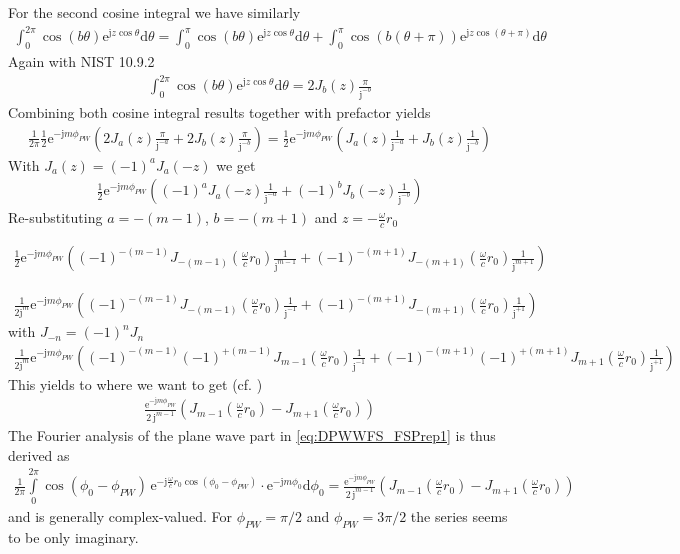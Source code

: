 \documentclass[a4paper,BCOR=15mm,10pt,twoside]{scrartcl}
\newcommand\e{\mathrm{e}}  %
\newcommand\im{\mathrm{j}}  %
\newcommand\fsd{\mathrm{d}}  %
\newcommand{\ExCalcCol}[2][CalcColor]{\textcolor{#1}{#2}} %
\begin{document}
For the second cosine integral we have similarly
\begin{align}
\int_0^{2\pi} \cos(b\theta) \mathrm{e}^{\mathrm{j} z \cos\theta} \fsd \theta = 
\int_0^{\pi} \cos(b\theta) \mathrm{e}^{\mathrm{j} z \cos\theta} \fsd \theta +
\int_0^{\pi} \cos(b(\theta+\pi)) \mathrm{e}^{\mathrm{j} z \cos(\theta+\pi)} \fsd \theta
\end{align}
Again with NIST 10.9.2
\begin{align}
\int_0^{2\pi} \cos(b\theta) \mathrm{e}^{\mathrm{j} z \cos\theta} \fsd \theta = 
2 J_{b}(z) \frac{\pi}{\im^{-b}}
\end{align}
Combining both cosine integral results together with prefactor yields
\begin{align}
\frac{1}{2\pi}
\frac{1}{2}
\e^{- \im m \phi_{PW}}
(2 J_{a}(z) \frac{\pi}{\im^{-a}} + 2 J_{b}(z) \frac{\pi}{\im^{-b}})
=
\frac{1}{2}
\e^{- \im m \phi_{PW}}
(J_{a}(z) \frac{1}{\im^{-a}} + J_{b}(z) \frac{1}{\im^{-b}})
\end{align}
With $J_a(z) = (-1)^a J_a(-z)$ we get
\begin{align}
\frac{1}{2}
\e^{- \im m \phi_{PW}}
((-1)^a J_{a}(-z) \frac{1}{\im^{-a}} + (-1)^b J_{b}(-z) \frac{1}{\im^{-b}})
\end{align}
Re-substituting $a=-(m-1)$, $b=-(m+1)$ and $z=-\frac{\omega}{c} r_0 $
\begin{calc}
\ExCalcCol{
\begin{align}
\frac{1}{2}
\e^{- \im m \phi_{PW}}
((-1)^{-(m-1)} J_{-(m-1)}(\frac{\omega}{c} r_0) \frac{1}{\im^{m-1}} + (-1)^{-(m+1)} J_{-(m+1)}(\frac{\omega}{c} r_0) \frac{1}{\im^{m+1}})
\end{align}
}
\end{calc}
\begin{align}
\frac{1}{2 \im^m}
\e^{- \im m \phi_{PW}}
((-1)^{-(m-1)} J_{-(m-1)}(\frac{\omega}{c} r_0) \frac{1}{\im^{-1}} + (-1)^{-(m+1)} J_{-(m+1)}(\frac{\omega}{c} r_0) \frac{1}{\im^{+1}})
\end{align}
with $J_{-n} = (-1)^n J_n$
\begin{align}
\frac{1}{2 \im^m}
\e^{- \im m \phi_{PW}}
((-1)^{-(m-1)} (-1)^{+(m-1)} J_{m-1}(\frac{\omega}{c} r_0) \frac{1}{\im^{-1}} + (-1)^{-(m+1)} (-1)^{+(m+1)} J_{m+1}(\frac{\omega}{c} r_0) \frac{1}{\im^{+1}})
\end{align}
This yields to where we want to get (cf.  \cite[Table 1]{Hahn2016AES})
\begin{align}
\frac{\e^{- \im m \phi_{PW}}}{2\,\im^{m-1}}
(J_{m-1}(\frac{\omega}{c} r_0) - J_{m+1}(\frac{\omega}{c} r_0))
\end{align}
The Fourier analysis of the plane wave part in \eqref{eq:DPWWFS_FSPrep1} is thus derived as
\begin{align}
\frac{1}{2 \pi}
\int\limits_0^{2 \pi}
\cos(\phi_0-\phi_{PW})
\, \mathrm{e}^{- \mathrm{j} \frac{\omega}{c} r_0
\cos(\phi_0-\phi_{PW})} \cdot \e^{- \im m \phi_0 } \fsd \phi_0 
= \frac{\e^{- \im m \phi_{PW}}}{2\,\im^{m-1}}
(J_{m-1}(\frac{\omega}{c} r_0) - J_{m+1}(\frac{\omega}{c} r_0))
\end{align}
and is generally complex-valued. For $\phi_{PW}=\pi/2$ and $\phi_{PW}=3\pi/2$  the series seems to be only imaginary.
\end{document}
